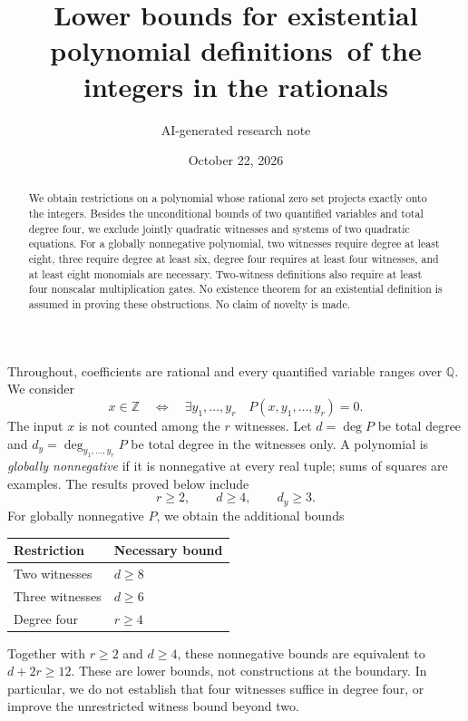 \documentclass[11pt]{article}
\title{Lower bounds for existential polynomial definitions\ of the integers in the rationals}
\author{AI-generated research note}
\date{October 22, 2026}
\theoremstyle{remark}\newtheorem{remark}[theorem]{Remark}
\newcommand{\Q}{\mathbb Q}\newcommand{\Z}{\mathbb Z}\newcommand{\R}{\mathbb R}
\begin{document}
\maketitle
\begin{abstract}
We obtain restrictions on a polynomial whose rational zero set projects exactly onto the integers. Besides the unconditional bounds of two quantified variables and total degree four, we exclude jointly quadratic witnesses and systems of two quadratic equations. For a globally nonnegative polynomial, two witnesses require degree at least eight, three require degree at least six, degree four requires at least four witnesses, and at least eight monomials are necessary. Two-witness definitions also require at least four nonscalar multiplication gates. No existence theorem for an existential definition is assumed in proving these obstructions. No claim of novelty is made.
\end{abstract}

Throughout, coefficients are rational and every quantified variable ranges over \(\Q\). We consider
\begin{equation}\label{definition}
 x\in\Z\quad\Longleftrightarrow\quad
 \exists y_1,\ldots,y_r\quad P(x,y_1,\ldots,y_r)=0.
\end{equation}
The input \(x\) is not counted among the \(r\) witnesses. Let \(d=\deg P\) be total degree and \(d_y=\deg_{y_1,\ldots,y_r}P\) be total degree in the witnesses only. A polynomial is \emph{globally nonnegative} if it is nonnegative at every real tuple; sums of squares are examples. The results proved below include
\[
 r\ge2,\qquad d\ge4,\qquad d_y\ge3.
\]
For globally nonnegative \(P\), we obtain the additional bounds
\begin{center}
\begin{tabular}{@{}ll@{}}\toprule
Restriction & Necessary bound\\\midrule
Two witnesses & \(d\ge8\) \\
Three witnesses & \(d\ge6\) \\
Degree four & \(r\ge4\) \\
\bottomrule\end{tabular}
\end{center}
Together with \(r\ge2\) and \(d\ge4\), these nonnegative bounds are equivalent to \(d+2r\ge12\). These are lower bounds, not constructions at the boundary. In particular, we do not establish that four witnesses suffice in degree four, or improve the unrestricted witness bound beyond two.
\end{document}
